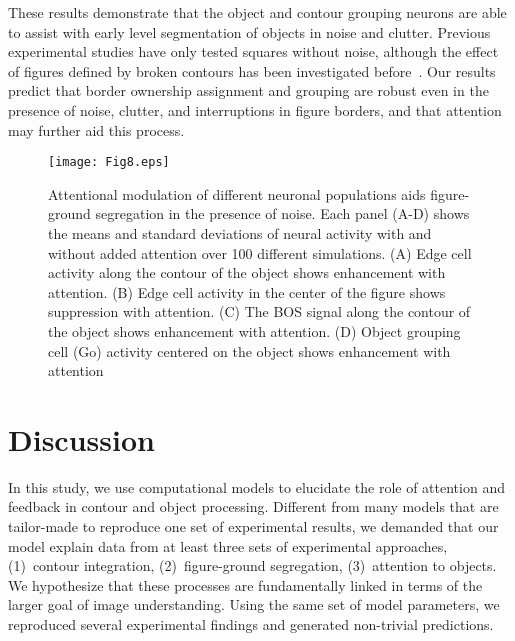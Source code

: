 These results demonstrate that the object and contour grouping neurons
are able to assist with early level segmentation of objects in noise
and clutter.  Previous experimental studies have only tested squares
without noise, although the effect of figures defined by broken
contours has been investigated before~\citep{Zhang_vonderHeydt10}.
Our results predict that border ownership assignment and grouping are
robust even in the presence of noise,  clutter, and interruptions in figure borders, 
and that attention may further aid this process.

\begin{figure*}[t]
\begin{center}
\texttt{[image: Fig8.eps]}
\end{center}
\caption{Attentional modulation of different neuronal populations aids figure-ground segregation in the presence of noise. Each panel (A-D) shows the means and standard deviations of neural activity with and without added attention over 100 different simulations. (A) Edge cell activity along the contour of the object shows enhancement with attention. (B) Edge cell activity in the center of the figure shows suppression with attention. (C) The BOS signal along the contour of the object shows enhancement with attention. (D) Object grouping cell (Go) activity centered on the object shows enhancement with attention}
\label{Fig:Attention_modulation}
\end{figure*}


\section{Discussion}
\label{sec:discussion}

In this study, we use computational models to elucidate the role of
attention and feedback in contour and object processing. Different
from many models that are tailor-made to reproduce one set of experimental
results, we demanded that our model explain data
from at least three sets of experimental approaches, (1)~contour
integration, (2)~figure-ground segregation, (3)~attention to objects.  
We hypothesize that these processes are fundamentally linked in terms of the larger
goal of image understanding.  Using the same set of model parameters,
we reproduced several experimental findings and generated non-trivial
predictions. 

